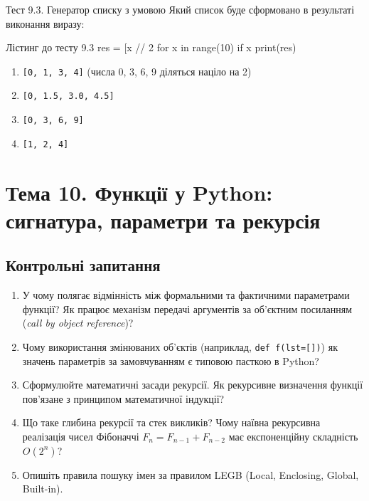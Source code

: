 \begin{pr}{Тест 9.3. Генератор списку з умовою}
Який список буде сформовано в результаті виконання виразу:
\begin{py}{Лістинг до тесту 9.3}
res = [x // 2 for x in range(10) if x %
print(res)
\end{py}
\begin{enumerate}[label=\textbf{\Alph*.}]
	\item \texttt{[0, 1, 3, 4]} (числа 0, 3, 6, 9 діляться націло на 2)
	\item \texttt{[0, 1.5, 3.0, 4.5]}
	\item \texttt{[0, 3, 6, 9]}
	\item \texttt{[1, 2, 4]}
\end{enumerate}
\end{pr}

\section{Тема 10. Функції у Python: сигнатура, параметри та рекурсія}

\subsection*{Контрольні запитання}
\begin{enumerate}[label=\textbf{10.\arabic*.}]
	\item У чому полягає відмінність між формальними та фактичними параметрами функції? Як працює механізм передачі аргументів за об'єктним посиланням (\textit{call by object reference})?
	\item Чому використання змінюваних об'єктів (наприклад, \texttt{def f(lst=[])}) як значень параметрів за замовчуванням є типовою пасткою в Python?
	\item Сформулюйте математичні засади рекурсії. Як рекурсивне визначення функції пов'язане з принципом математичної індукції?
	\item Що таке глибина рекурсії та стек викликів? Чому наївна рекурсивна реалізація чисел Фібоначчі $F_n = F_{n-1} + F_{n-2}$ має експоненційну складність $O(2^n)$?
	\item Опишіть правила пошуку імен за правилом LEGB (Local, Enclosing, Global, Built-in).
\end{enumerate}

